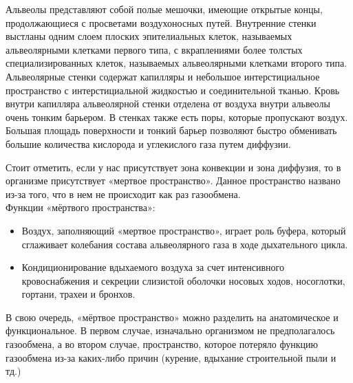 \documentclass{article}
\begin{document}
            Альвеолы представляют собой полые мешочки, имеющие открытые концы,
            продолжающиеся с просветами воздухоносных путей. Внутренние стенки
            выстланы одним слоем плоских эпителиальных клеток, называемых
            альвеолярными клетками первого типа, с вкраплениями более толстых
            специализированных клеток, называемых альвеолярными клетками второго
            типа. Альвеолярные стенки содержат капилляры и небольшое интерстициальное
            пространство с интерстициальной жидкостью и соединительной тканью. Кровь
            внутри капилляра альвеолярной стенки отделена от воздуха внутри альвеолы
            очень тонким барьером. В стенках также есть поры, которые пропускают воздух.
            Большая площадь поверхности и тонкий барьер позволяют быстро обменивать
            большие количества кислорода и углекислого газа путем диффузии.
            \vspace*{4mm}

            Стоит отметить, если у нас присутствует зона конвекции и зона
            диффузия, то в организме присутствует «мертвое пространство». Данное
            пространство названо из-за того, что в нем не происходит как раз газообмена. \\

            Функции «мёртвого пространства»:

            \begin{itemize}
                \item Воздух, заполняющий «мертвое пространство», играет роль буфера,
                который сглаживает колебания состава альвеолярного газа в ходе
                дыхательного цикла.

                \item Кондиционирование вдыхаемого воздуха за счет интенсивного
                кровоснабжения и секреции слизистой оболочки носовых ходов,
                носоглотки, гортани, трахеи и бронхов.
            \end{itemize}
        
            В свою очередь, «мёртвое пространство» можно разделить на
            анатомическое и функциональное. В первом случае, изначально
            организмом не предполагалось газообмена, а во втором случае,
            пространство, которое потеряло функцию газообмена из-за каких-либо
            причин (курение, вдыхание строительной пыли и тд.)
            \newpage

\end{document}
